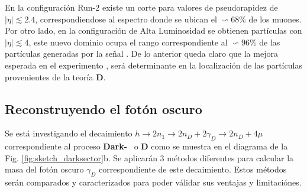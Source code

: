 En la configuración  Run-2 existe un corte para valores de pseudorapidez de $|\eta|\lesssim 2.4$, correspondiendose al espectro donde se ubican el $\backsim 68\%$ de los muones. Por otro lado, en la configuración de Alta Luminosidad se obtienen partículas con $|\eta|\lesssim 4$, este nuevo dominio ocupa el rango correspondiente al $\backsim 96\%$ de las partículas generadas por la señal \MC. De lo anterior queda claro que la mejora esperada en el experimento \CMS, será determinante en la localización de las partículas provenientes de la teoría \MSSM\textbf{D}.



\subsection{Reconstruyendo el fotón oscuro}
Se está investigando el decaimiento $h \rightarrow 2n_1 \rightarrow 2n_D + 2\gamma_D \rightarrow 2n_D + 4\mu$ correspondiente al proceso \textbf{Dark-}\SUSY ~ o \MSSM\textbf{D} como se muestra en el diagrama de la Fig. \ref{fig:sketch_darksector}b. Se aplicarán 3 métodos diferentes para calcular la masa del fotón oscuro $\gamma_D$ correspondiente de este decaimiento. Estos métodos serán comparados y caracterizados para poder válidar sus ventajas y limitaciónes.



